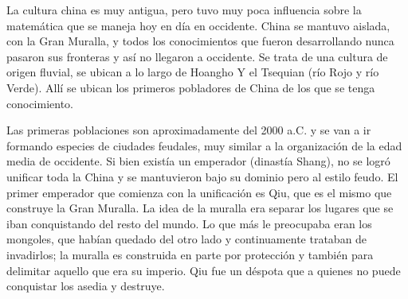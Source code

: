 \begin{comment}
-------------------------
----------Plot-----------
-------------------------
Insert section plot from 1-plot.text here
-Section 1-
Max X words

----AIM----




--Details--




-------------------------
------Senses Check-------
-------------------------
Smell
Touch
Sound
Taste
Sight

-------------------------
------Other Checks-------
-------------------------
Checked adverb use? (0)
Checked cliche use? (0)
Checked tense integrity?
Checked perspective integrity?
Checked reuse of major words?
Checked sentence length?
Checked simile use? (<=5)
Checked metaphor use? (<=3)
Checked description length?
Checked paragraph density

Zombie Ipsum text from here: http://www.zombieipsum.com/
\end{comment}


La cultura china es muy antigua, pero tuvo muy poca influencia sobre la matemática que se maneja hoy en día en occidente. China se mantuvo aislada, con la Gran Muralla, y todos los conocimientos que fueron desarrollando nunca pasaron sus fronteras y así no llegaron a occidente. Se trata de una cultura de origen fluvial, se ubican a lo largo de Hoangho Y el Tsequian (río Rojo y río Verde). Allí se ubican los primeros pobladores de China de los que se tenga conocimiento.

Las primeras poblaciones son aproximadamente del 2000 a.C. y se van a ir formando especies de ciudades feudales, muy similar a la organización de la edad media de occidente. Si bien existía un emperador (dinastía Shang), no se logró unificar toda la China y se mantuvieron bajo su dominio pero al estilo feudo. El primer emperador que comienza con la unificación es Qiu, que es el mismo que construye la Gran Muralla. La idea de la muralla era separar los lugares que se iban conquistando del resto del mundo. Lo que más le preocupaba eran los mongoles, que habían quedado del otro lado y continuamente trataban de invadirlos; la muralla es construida en parte por protección y también para delimitar aquello que era su imperio. Qiu fue un déspota que a quienes no puede conquistar los asedia y destruye.

